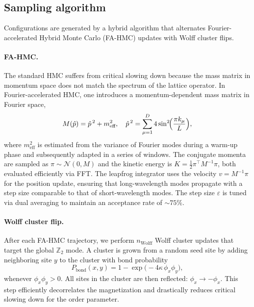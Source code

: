 \documentclass[reprint,twocolumn,superscriptaddress,preprintnumbers,amsmath,amssymb,aps,prd,floatfix]{revtex4-2}
\begin{document}
\subsection{Sampling algorithm}
\label{sec:wolff_fahmc}

Configurations are generated by a hybrid algorithm that alternates Fourier-accelerated Hybrid Monte Carlo (FA-HMC) updates with Wolff cluster flips.

\paragraph{FA-HMC.}
The standard HMC suffers from critical slowing down because the mass matrix in momentum space does not match the spectrum of the lattice operator. In Fourier-accelerated HMC, one introduces a momentum-dependent mass matrix in Fourier space,
\begin{equation}
M(\hat p) = \hat p^{\,2} + m_{\text{eff}}^2,\quad
\hat p^{\,2} = \sum_{\mu=1}^{D} 4\sin^2\!\Bigl(\frac{\pi k_\mu}{L}\Bigr),
\label{eq:fourier_mass}
\end{equation}
where $m_{\text{eff}}^2$ is estimated from the variance of Fourier modes during a warm-up phase and subsequently adapted in a series of windows. The conjugate momenta are sampled as $\pi\sim\mathcal{N}(0,M)$ and the kinetic energy is $K=\frac{1}{2}\pi^\top M^{-1}\pi$, both evaluated efficiently via FFT. The leapfrog integrator uses the velocity $v=M^{-1}\pi$ for the position update, ensuring that long-wavelength modes propagate with a step size comparable to that of short-wavelength modes. The step size $\varepsilon$ is tuned via dual averaging to maintain an acceptance rate of $\sim 75\%$.

\paragraph{Wolff cluster flip.}
After each FA-HMC trajectory, we perform $n_\text{Wolff}$ Wolff cluster updates that target the global $\mathbb{Z}_2$ mode. A cluster is grown from a random seed site by adding neighboring site $y$ to the cluster with bond probability
\begin{equation}
P_{\text{bond}}(x,y) = 1 - \exp\bigl(-4\kappa\,\phi_x\phi_y\bigr),
\label{eq:wolff_bond}
\end{equation}
whenever $\phi_x\phi_y > 0$. All sites in the cluster are then reflected: $\phi_x\to -\phi_x$. This step efficiently decorrelates the magnetization and drastically reduces critical slowing down for the order parameter.
\end{document}
